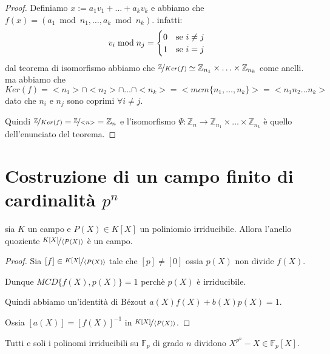 \documentclass[10pt,a4paper,twoside]{book}
\begin{document}
\begin{proof}
    Definiamo $x := a_1 v_1 + \ldots + a_k v_k$ e abbiamo che $f(x) = (a_1 \bmod n_1, \ldots , a_k \bmod n_k)$. infatti:
    \begin{equation*}
        v_i \bmod n_j =
        \begin{cases}
            0 & \text{se } i \neq j \\
            1 & \text{se } i = j
        \end{cases}\\
    \end{equation*}
    dal teorema di isomorfismo abbiamo che $\nicefrac{\mathbb{Z}}{Ker(f)} \simeq \mathbb{Z}_{n_1} \times \ldots \times \mathbb{Z}_{n_k} $ come anelli. ma abbiamo che $Ker(f) = <n_1> \cap <n_2> \cap \ldots \cap <n_k> = <mcm\{n_1 ,\ldots, n_k\}> = <n_1 n_2 \ldots n_k>$ dato che $n_i$ e $n_j$ sono coprimi $\forall i \neq j$.

    Quindi $\nicefrac{\mathbb{Z}}{Ker(f)} = \nicefrac{\mathbb{Z}}{<n>} = \mathbb{Z}_n $ e l'isomorfismo $\Psi: \mathbb{Z}_n \rightarrow \mathbb{Z}_{n_1} \times \ldots \times \mathbb{Z}_{n_k}$ è quello dell'enunciato del teorema.
\end{proof}
\newpage

\section{Costruzione di un campo finito di cardinalità \(p^n\)}
\begin{proposition}
    sia $K$ un campo e $P(X) \in K[X]$ un poliniomio irriducibile. Allora l'anello quoziente $\nicefrac{K[X]}{\langle P(X)\rangle}$ è un campo.
\end{proposition}
\begin{proof}
    Sia $[f] \in \nicefrac{K[X]}{\langle P(X)\rangle}$ tale che $[p] \neq [0]$ ossia $p(X)$ non divide $f(X)$.

    Dunque $MCD\{f(X),p(X)\} = 1$ perchè $p(X)$ è irriducibile.

    Quindi abbiamo un'identità di Bézout $a(X)f(X) + b(X)p(X) = 1$.

    Ossia $[a(X)] = [f(X)]^{-1}$ in $\nicefrac{K[X]}{\langle P(X)\rangle}$.
\end{proof}

\begin{proposition}
    Tutti e soli i polinomi irriducibili su $\mathbb{F}_p$ di grado $n$ dividono $X^{p^n} - X \in \mathbb{F}_p[X]$.
\end{proposition}
\end{document}
